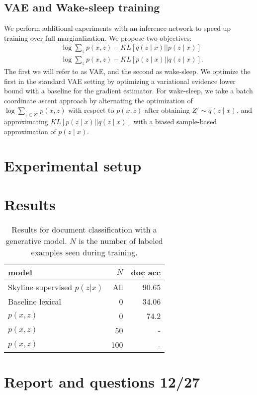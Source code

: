 \documentclass[11pt]{article}
\begin{document}
\subsection{VAE and Wake-sleep training}
We perform additional experiments with an inference network to speed up training
over full marginalization.
We propose two objectives:
\begin{align}
&\log\sum_z p(x,z) - KL[q(z\mid x) || p(z \mid x)]\\
&\log\sum_z p(x,z) - KL[p(z\mid x) || q(z \mid x)].
\end{align}
The first we will refer to as VAE, and the second as wake-sleep.
We optimize the first in the standard VAE setting by optimizing a variational evidence
lower bound with a baseline for the gradient estimator.
For wake-sleep, we take a batch coordinate ascent approach by alternating the optimization of
$\log\sum_{z\in Z'}p(x,z)$ with respect to $p(x,z)$ after obtaining $Z'\sim q(z\mid x)$,
and approximating $KL[p(z \mid x) ||q(z \mid x)]$ with a biased sample-based approximation
of $p(z \mid x)$.

\section{Experimental setup}

\section{Results}

\begin{table}
\centering
\begin{tabular}{lrr}
\toprule
model & $N$ & doc acc\\
\midrule
Skyline supervised $p(z|x)$ & All & 90.65\\
Baseline lexical & 0 & 34.06\\
$p(x,z)$ & 0 & 74.2\\
$p(x,z)$ & 50 & -\\
$p(x,z)$ & 100 & -\\
\bottomrule
\end{tabular}
\caption{
\label{tbl:unsup-doc}
Results for document classification with a generative model.
$N$ is the number of labeled examples seen during training.}
\end{table}





\appendix

\section{Report and questions 12/27}
\end{document}
